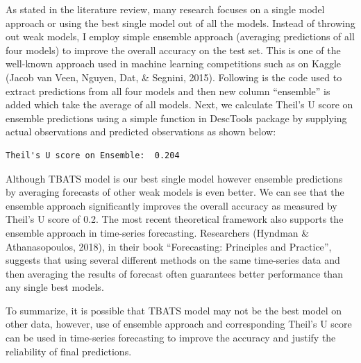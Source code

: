 \documentclass[11pt,oneside,a4paper]{reedthesis}
\newenvironment{Shaded}{\begin{snugshade}}{\end{snugshade}}
\newcommand{\KeywordTok}[1]{\textcolor[rgb]{0.13,0.29,0.53}{\textbf{#1}}}
\newcommand{\DataTypeTok}[1]{\textcolor[rgb]{0.13,0.29,0.53}{#1}}
\newcommand{\DecValTok}[1]{\textcolor[rgb]{0.00,0.00,0.81}{#1}}
\newcommand{\StringTok}[1]{\textcolor[rgb]{0.31,0.60,0.02}{#1}}
\newcommand{\CommentTok}[1]{\textcolor[rgb]{0.56,0.35,0.01}{\textit{#1}}}
\newcommand{\OperatorTok}[1]{\textcolor[rgb]{0.81,0.36,0.00}{\textbf{#1}}}
\newcommand{\NormalTok}[1]{#1}
\begin{document}
As stated in the literature review, many research focuses on a single
model approach or using the best single model out of all the models.
Instead of throwing out weak models, I employ simple ensemble approach
(averaging predictions of all four models) to improve the overall
accuracy on the test set. This is one of the well-known approach used in
machine learning competitions such as on Kaggle (Jacob van Veen, Nguyen,
Dat, \& Segnini, 2015). Following is the code used to extract
predictions from all four models and then new column ``ensemble'' is
added which take the average of all models. Next, we calculate Theil's U
score on ensemble predictions using a simple function in DescTools
package by supplying actual observations and predicted observations as
shown below:
\begin{Shaded}
\end{Shaded}
\begin{verbatim}
Theil's U score on Ensemble:  0.204
\end{verbatim}
Although TBATS model is our best single model however ensemble
predictions by averaging forecasts of other weak models is even better.
We can see that the ensemble approach significantly improves the overall
accuracy as measured by Theil's U score of 0.2. The most recent
theoretical framework also supports the ensemble approach in time-series
forecasting. Researchers (Hyndman \& Athanasopoulos, 2018), in their
book ``Forecasting: Principles and Practice'', suggests that using
several different methods on the same time-series data and then
averaging the results of forecast often guarantees better performance
than any single best models.

To summarize, it is possible that TBATS model may not be the best model
on other data, however, use of ensemble approach and corresponding
Theil's U score can be used in time-series forecasting to improve the
accuracy and justify the reliability of final predictions.
\end{document}
